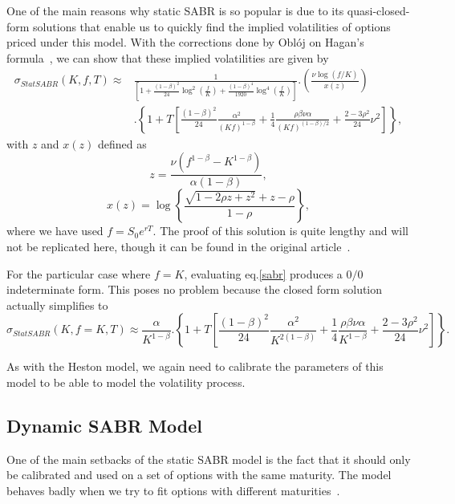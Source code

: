 One of the main reasons why static SABR is so popular is due to its quasi-closed-form solutions that enable us to quickly find the implied volatilities of options priced under this model. With the corrections done by Oblój on Hagan's formula~\citep{Obloj}, we can show that these implied volatilities are given by
\begin{equation}\label{sabr}
\begin{split}
\sigma_{StatSABR}(K,f,T)\approx&\frac{1}{\displaystyle\left[1+\frac{(1-\beta)^2}{24}\log^2\left(\frac{f}{K}\right)+\frac{(1-\beta)^4}{1920}\log^4\left(\frac{f}{K}\right)\right]}.\left(\frac{\nu\log\left(f/K\right)}{x(z)}\right)\\
&.\left\{1+T\left[\frac{(1-\beta)^2}{24}\frac{\alpha^2}{(Kf)^{1-\beta}}+\frac{1}{4}\frac{\rho\beta\nu\alpha}{(Kf)^{(1-\beta)/2}}+\frac{2-3\rho^2}{24}\nu^2\right]\right\},
\end{split}
\end{equation}
\noindent with $z$ and $x(z)$ defined as
\begin{equation}
z=\frac{\nu\left(f^{1-\beta}-K^{1-\beta}\right)}{\alpha(1-\beta)},
\end{equation}
\begin{equation}
x(z)=\log\left\{\frac{\sqrt{1-2\rho z+z^2}+z-\rho}{1-\rho}\right\},
\end{equation}
\noindent where we have used $f=S_0e^{rT}$. The proof of this solution is quite lengthy and will not be replicated here, though it can be found in the original article~\citep{Hagan}.

For the particular case where $f=K$, evaluating eq.\eqref{sabr} produces a $0/0$ indeterminate form. This poses no problem because the closed form solution actually simplifies to~\citep{Hagan}
\begin{equation}
\sigma_{StatSABR}(K,f=K,T)\approx\frac{\alpha}{K^{1-\beta}}.\left\{1+T\left[\frac{(1-\beta)^2}{24}\frac{\alpha^2}{K^{2(1-\beta)}}+\frac{1}{4}\frac{\rho\beta\nu\alpha}{K^{1-\beta}}+\frac{2-3\rho^2}{24}\nu^2\right]\right\}.
\end{equation}

As with the Heston model, we again need to calibrate the parameters of this model to be able to model the volatility process.


\subsection{Dynamic SABR Model}
\label{subsection:Dynamic SABR Model}
One of the main setbacks of the static SABR model is the fact that it should only be calibrated and used on a set of options with the same maturity. The model behaves badly when we try to fit options with different maturities~\citep{Hagan}. 

